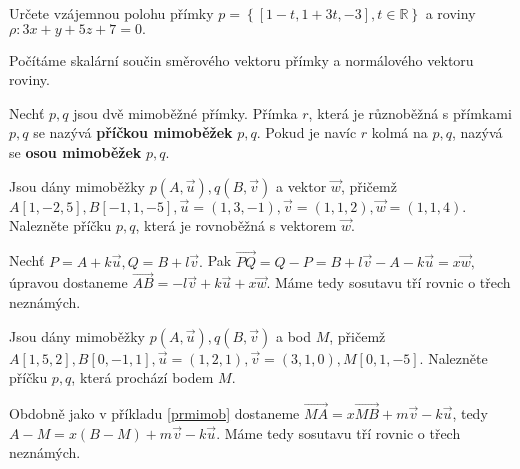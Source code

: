 \begin{priklad}
Určete vzájemnou polohu přímky $p=\left \{ [1-t,1+3t,-3],t \in \mathbb R \right \} $ a
roviny $\rho:3x+y+5z+7=0.$
\end{priklad}

\begin{reseni}
Počítáme skalární součin směrového vektoru přímky a normálového vektoru roviny.
\end{reseni}

\begin{definition}
Nechť $p,q$ jsou dvě mimoběžné přímky. Přímka $r$, která je různoběžná s přímkami
$p,q$ se nazývá \textbf{příčkou mimoběžek} $p,q$. Pokud je navíc $r$ kolmá na $p,q$,
nazývá se \textbf{osou mimoběžek} $p,q$.
\end{definition}

\begin{priklad}\label{prmimob}
Jsou dány mimoběžky  $p(A,\vec u), q(B,\vec v)$ a vektor $\vec w$, přičemž
$A[1,-2,5],B[-1,1,-5], \vec u = (1,3,-1), \vec v=(1,1,2), \vec w = (1,1,4).$
Nalezněte příčku $p,q$, která je rovnoběžná s vektorem $\vec w.$
\end{priklad}

\begin{reseni}
Nechť $P=A+k\vec u, Q=B+l\vec v.$ Pak $\overrightarrow{PQ}=Q-P=B+l\vec v - A - k\vec u=x\vec w,$
úpravou dostaneme $\overrightarrow{AB}=-l\vec v+k\vec u+x\vec w.$ Máme tedy
sosutavu tří rovnic o třech neznámých.
\end{reseni}

\begin{priklad}
Jsou dány mimoběžky $p(A,\vec u), q(B,\vec v)$ a bod $M$, přičemž
$A[1,5,2],B[0,-1,1], \vec u=(1,2,1), \vec v = (3,1,0), M[0,1,-5].$  Nalezněte
příčku $p,q$, která prochází bodem $M$.
\end{priklad}

\begin{reseni}
Obdobně jako v příkladu \ref{prmimob} dostaneme $\overrightarrow{MA}=x\overrightarrow{MB}+m\vec v-k\vec u$,
tedy $A-M=x(B-M)+m\vec v - k\vec u$. Máme tedy
sosutavu tří rovnic o třech neznámých.
\end{reseni}
